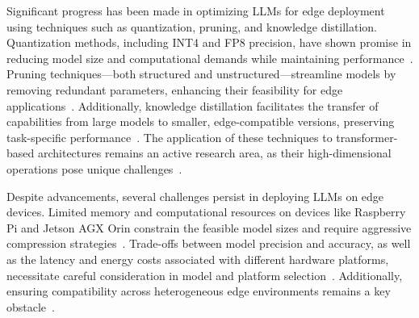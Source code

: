 \documentclass[conference]{IEEEtran}
\begin{document}
Significant progress has been made in optimizing LLMs for edge deployment using techniques such as quantization, pruning, and knowledge distillation. Quantization methods, including INT4 and FP8 precision, have shown promise in reducing model size and computational demands while maintaining performance~\cite{zheng2024review, dhar2024empirical, chitty2024llm}. Pruning techniques—both structured and unstructured—streamline models by removing redundant parameters, enhancing their feasibility for edge applications~\cite{zheng2024review}. Additionally, knowledge distillation facilitates the transfer of capabilities from large models to smaller, edge-compatible versions, preserving task-specific performance~\cite{zheng2024review}. The application of these techniques to transformer-based architectures remains an active research area, as their high-dimensional operations pose unique challenges~\cite{zheng2024review, dhar2024empirical}.


Despite advancements, several challenges persist in deploying LLMs on edge devices. Limited memory and computational resources on devices like Raspberry Pi and Jetson AGX Orin constrain the feasible model sizes and require aggressive compression strategies~\cite{dhar2024empirical, chitty2024llm}. Trade-offs between model precision and accuracy, as well as the latency and energy costs associated with different hardware platforms, necessitate careful consideration in model and platform selection~\cite{dhar2024empirical, chitty2024llm}. Additionally, ensuring compatibility across heterogeneous edge environments remains a key obstacle~\cite{zheng2024review}.

\end{document}
